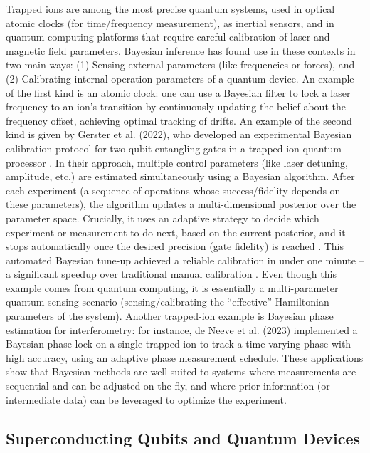 Trapped ions are among the most precise quantum systems, used in
optical atomic clocks (for time/frequency measurement), as inertial
sensors, and in quantum computing platforms that require careful
calibration of laser and magnetic field parameters. Bayesian inference
has found use in these contexts in two main ways: (1) Sensing external
parameters (like frequencies or forces), and (2) Calibrating internal
operation parameters of a quantum device. An example of the first kind
is an atomic clock: one can use a Bayesian filter to lock a laser
frequency to an ion’s transition by continuously updating the belief
about the frequency offset, achieving optimal tracking of drifts. An
example of the second kind is given by Gerster et al. (2022), who
developed an experimental Bayesian calibration protocol for two-qubit
entangling gates in a trapped-ion quantum processor . In their
approach, multiple control parameters (like laser detuning, amplitude,
etc.) are estimated simultaneously using a Bayesian algorithm. After
each experiment (a sequence of operations whose success/fidelity
depends on these parameters), the algorithm updates a
multi-dimensional posterior over the parameter space. Crucially, it
uses an adaptive strategy to decide which experiment or measurement to
do next, based on the current posterior, and it stops automatically
once the desired precision (gate fidelity) is reached . This automated
Bayesian tune-up achieved a reliable calibration in under one minute –
a significant speedup over traditional manual calibration . Even
though this example comes from quantum computing, it is essentially a
multi-parameter quantum sensing scenario (sensing/calibrating the
“effective” Hamiltonian parameters of the system). Another trapped-ion
example is Bayesian phase estimation for interferometry: for instance,
de Neeve et al. (2023) implemented a Bayesian phase lock on a single
trapped ion to track a time-varying phase with high accuracy, using an
adaptive phase measurement schedule. These applications show that
Bayesian methods are well-suited to systems where measurements are
sequential and can be adjusted on the fly, and where prior information
(or intermediate data) can be leveraged to optimize the experiment.



\subsection{Superconducting Qubits and Quantum Devices}

